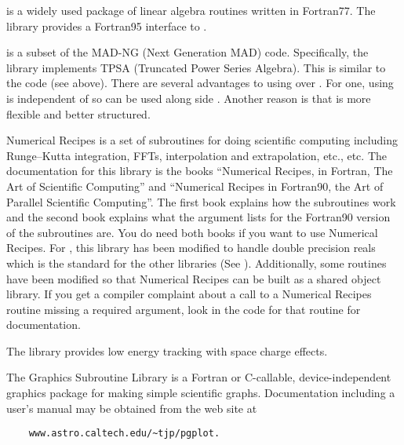 {{{{{{\begin{description}
%
  \item[lapack / lapack95] \Newline
{} is a widely used package of linear algebra routines written in Fortran77. The
 library provides a Fortran95 interface to .
%
  \item[mad_tpsa] \Newline
{} is a subset of the MAD-NG (Next Generation MAD) code\cite{b:mad.ng}. Specifically, the
 library implements TPSA (Truncated Power Series Algebra). This is similar to the
 code (see above). There are several advantages to using  over . For one, using
 is independent of  so  can be used along side . Another
reason is that  is more flexible and better structured.
%
  \item[recipes] \Newline
Numerical Recipes is a set of subroutines for doing scientific computing including Runge--Kutta
integration, FFTs, interpolation and extrapolation, etc., etc. The documentation for this library is
the books ``Numerical Recipes, in Fortran, The Art of Scientific Computing'' and ``Numerical Recipes
in Fortran90, the Art of Parallel Scientific Computing''\cite{b:nr}.  The first book explains how
the subroutines work and the second book explains what the argument lists for the Fortran90 version
of the subroutines are. You do need both books if you want to use Numerical Recipes. For \bmad, this
library has been modified to handle double precision reals which is the standard for the other
libraries (See ). Additionally, some routines have been modified so that Numerical
Recipes can be built as a shared object library. If you get a compiler complaint about a call to a
Numerical Recipes routine missing a required argument, look in the code for that routine for
documentation.
%
  \item[open_spacecharge] \Newline
The  library provides low energy tracking with space charge effects.
%
  \item[PGPLOT] \Newline
The  Graphics Subroutine Library is a Fortran or C-callable, device-independent graphics
package for making simple scientific graphs. Documentation including a user's manual may be obtained
from the  web site at
\begin{verbatim}
    www.astro.caltech.edu/~tjp/pgplot.
\end{verbatim} 

\end{description}}}}}}}
